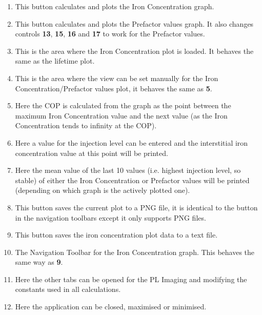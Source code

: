 \documentclass[final,a4paper,oneside,12pt]{article}
\begin{document}
\begin{enumerate}
\item This button calculates and plots the Iron Concentration graph.

\item This button calculates and plots the Prefactor values graph. It also changes controls {\color{red} {\bf 13}}, {\color{red} {\bf 15}}, {\color{red} {\bf 16}} and {\color{red} {\bf 17}} to work for the Prefactor values.

\item This is the area where the Iron Concentration plot is loaded. It behaves the same as the lifetime plot.

\item This is the area where the view can be set manually for the Iron Concentration/Prefactor values plot, it behaves the same as {\color{red} {\bf 5}}.

\item Here the COP is calculated from the graph as the point between the maximum Iron Concentration value and the next value (as the Iron Concentration tends to infinity at the COP).

\item Here a value for the injection level can be entered and the interstitial iron concentration value at this point will be printed.

\item Here the mean value of the last 10 values (i.e. highest injection level, so stable) of either the Iron Concentration or Prefactor values will be printed (depending on which graph is the actively plotted one).

\item This button saves the current plot to a PNG file, it is identical to the button in the navigation toolbars except it only supports PNG files.

\item This button saves the iron concentration plot data to a text file.

\item The Navigation Toolbar for the Iron Concentration graph. This behaves the same way as {\color{red} {\bf 9}}.

\item Here the other tabs can be opened for the PL Imaging and modifying the constants used in all calculations.

\item Here the application can be closed, maximised or minimised.
\end{enumerate}
\end{document}
